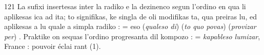 \begin{VUpage}[125]{121}
La sufixi insertesas inter la radiko e la dezinenco segun\nl
l'ordino en qua li aplikesas ica ad ita; to signifikas, ke\nl
singla de oli modifikas ta, qua preiras lu, ed aplikesas a\nl
lu quale a simpla radiko :  = eso (\textit{qualeso di})\nl
{} (\textit{to quo povas})  (\textit{provizar per}) . Praktike on\nl
sequas l'ordino progresanta dil kompozo : \nl
{} = \textit{kapableso lumizar}, France : pouvoir éclai\cc
rant (1).
\end{VUpage}

